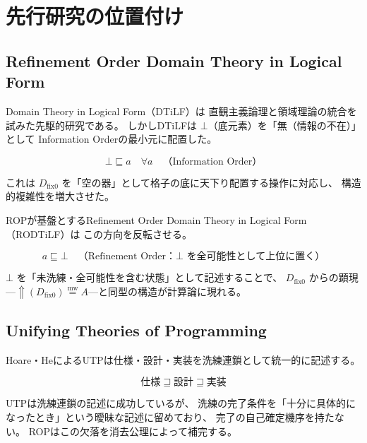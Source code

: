 \documentclass[11pt,a4paper]{article}
\theoremstyle{definition}
\newcommand{\mweq}{\mathrel{\overset{\mathrm{mw}}{=}}}
\newcommand{\dfix}{D_{\mathrm{fix}0}}
\newcommand{\metanegation}{\Uparrow}
\begin{document}
\section{先行研究の位置付け}

\subsection{Refinement Order Domain Theory in Logical Form}

Domain Theory in Logical Form（DTiLF）\cite{Abramsky1991}は
直観主義論理と領域理論の統合を試みた先駆的研究である。
しかしDTiLFは $\bot$（底元素）を「無（情報の不在）」として
Information Orderの最小元に配置した。

\begin{equation}
\bot \sqsubseteq a \quad \forall a \quad \text{（Information Order）}
\end{equation}

これは $\dfix$ を「空の器」として格子の底に天下り配置する操作に対応し、
構造的複雑性を増大させた。

ROPが基盤とするRefinement Order Domain Theory in Logical Form（RODTiLF）は
この方向を反転させる。

\begin{equation}
a \sqsubseteq \bot \quad \text{（Refinement Order：$\bot$ を全可能性として上位に置く）}
\end{equation}

$\bot$ を「未洗練・全可能性を含む状態」として記述することで、
$\dfix$ からの顕現---$\metanegation(\dfix) \mweq A$---と同型の構造が計算論に現れる。

\subsection{Unifying Theories of Programming}

Hoare・HeによるUTP\cite{Hoare1998}は仕様・設計・実装を洗練連鎖として統一的に記述する。

\begin{equation}
\text{仕様} \sqsupseteq \text{設計} \sqsupseteq \text{実装}
\end{equation}

UTPは洗練連鎖の記述に成功しているが、
洗練の完了条件を「十分に具体的になったとき」という曖昧な記述に留めており、
完了の自己確定機序を持たない。
ROPはこの欠落を消去公理によって補完する。
\end{document}

